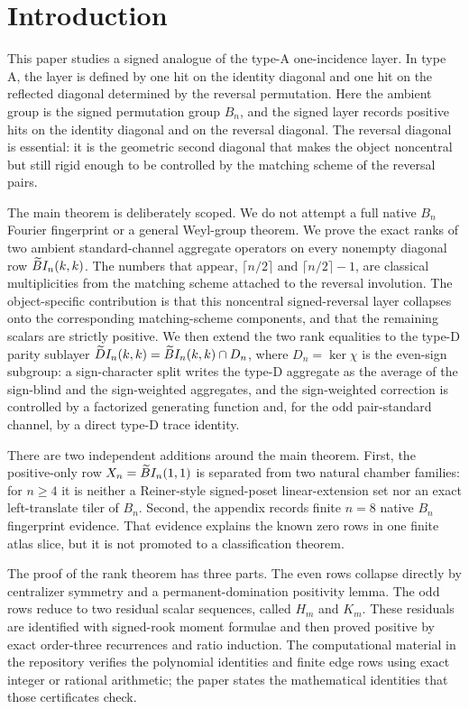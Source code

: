 \section{Introduction}\label{sec:introduction}

This paper studies a signed analogue of the type-A one-incidence layer.  In type A, the layer is defined by one hit on the identity diagonal and one hit on the reflected diagonal determined by the reversal permutation.  Here the ambient group is the signed permutation group $B_n$, and the signed layer records positive hits on the identity diagonal and on the reversal diagonal.  The reversal diagonal is essential: it is the geometric second diagonal that makes the object noncentral but still rigid enough to be controlled by the matching scheme of the reversal pairs.

The main theorem is deliberately scoped.  We do not attempt a full native $B_n$ Fourier fingerprint or a general Weyl-group theorem.  We prove the exact ranks of two ambient standard-channel aggregate operators on every nonempty diagonal row $\widetilde{B}I_n(k,k)$.  The numbers that appear, $\lceil n/2\rceil$ and $\lceil n/2\rceil-1$, are classical multiplicities from the matching scheme attached to the reversal involution.  The object-specific contribution is that this noncentral signed-reversal layer collapses onto the corresponding matching-scheme components, and that the remaining scalars are strictly positive.  We then extend the two rank equalities to the type-D parity sublayer $\widetilde{D}I_n(k,k)=\widetilde{B}I_n(k,k)\cap D_n$, where $D_n=\ker\chi$ is the even-sign subgroup: a sign-character split writes the type-D aggregate as the average of the sign-blind and the sign-weighted aggregates, and the sign-weighted correction is controlled by a factorized generating function and, for the odd pair-standard channel, by a direct type-D trace identity.

There are two independent additions around the main theorem.  First, the positive-only row $X_n=\widetilde{B}I_n(1,1)$ is separated from two natural chamber families: for $n\ge4$ it is neither a Reiner-style signed-poset linear-extension set nor an exact left-translate tiler of $B_n$.  Second, the appendix records finite $n=8$ native $B_n$ fingerprint evidence.  That evidence explains the known zero rows in one finite atlas slice, but it is not promoted to a classification theorem.

The proof of the rank theorem has three parts.  The even rows collapse directly by centralizer symmetry and a permanent-domination positivity lemma.  The odd rows reduce to two residual scalar sequences, called $H_m$ and $K_m$.  These residuals are identified with signed-rook moment formulae and then proved positive by exact order-three recurrences and ratio induction.  The computational material in the repository verifies the polynomial identities and finite edge rows using exact integer or rational arithmetic; the paper states the mathematical identities that those certificates check.

